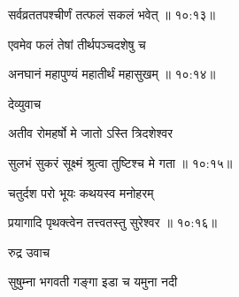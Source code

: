 
{\devanagarifont सर्वव्रततपश्चीर्णं तत्फलं सकलं भवेत् {॥ १०:१३॥} \veg\dontdisplaylinenum }%

{\devanagarifont एवमेव फलं तेषां तीर्थपञ्चदशेषु च \thinspace{\dandab} \dontdisplaylinenum }%


{\devanagarifont अनघानं महापुण्यं महातीर्थं महासुखम् {॥ १०:१४॥} \veg\dontdisplaylinenum }%

{\devanagarifont देव्युवाच {\dandab}\dontdisplaylinenum  }%
 
{\devanagarifont अतीव रोमहर्षो मे जातो ऽस्ति त्रिदशेश्वर \thinspace{\danda} \dontdisplaylinenum }%


{\devanagarifont सुलभं सुकरं सूक्ष्मं श्रुत्वा तुष्टिश्च मे गता {॥ १०:१५॥} \veg\dontdisplaylinenum }%

{\devanagarifont चतुर्दश परो भूयः कथयस्व मनोहरम् \thinspace{\dandab} \dontdisplaylinenum }%
 

{\devanagarifont प्रयागादि पृथक्त्वेन तत्त्वतस्तु सुरेश्वर {॥ १०:१६॥} \veg\dontdisplaylinenum }%



{\devanagarifont रुद्र उवाच {\dandab}\dontdisplaylinenum  }%
 
{\devanagarifont सुषुम्ना भगवती गङ्गा इडा च यमुना नदी \thinspace{\danda} \dontdisplaylinenum }%

